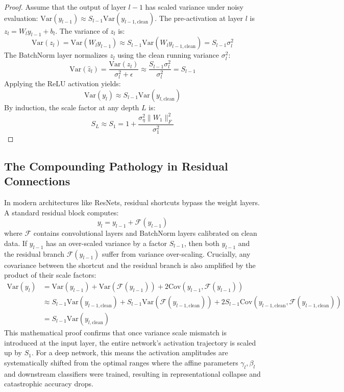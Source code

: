 \documentclass{article}
\theoremstyle{plain}
\theoremstyle{definition}
\theoremstyle{remark}
\begin{document}
\begin{proof}
Assume that the output of layer $l-1$ has scaled variance under noisy evaluation: $\text{Var}(y_{l-1}) \approx S_{l-1} \text{Var}(y_{l-1,\text{clean}})$.
The pre-activation at layer $l$ is $z_l = W_l y_{l-1} + b_l$. The variance of $z_l$ is:
\begin{equation}
    \text{Var}(z_l) = \text{Var}(W_l y_{l-1}) \approx S_{l-1} \text{Var}(W_l y_{l-1,\text{clean}}) = S_{l-1} \sigma^2_l
\end{equation}
The BatchNorm layer normalizes $z_l$ using the clean running variance $\sigma^2_l$:
\begin{equation}
    \text{Var}(\hat{z}_l) = \frac{\text{Var}(z_l)}{\sigma^2_l + \epsilon} \approx \frac{S_{l-1} \sigma^2_l}{\sigma^2_l} = S_{l-1}
\end{equation}
Applying the ReLU activation yields:
\begin{equation}
    \text{Var}(y_l) \approx S_{l-1} \text{Var}(y_{l,\text{clean}})
\end{equation}
By induction, the scale factor at any depth $L$ is:
\begin{equation}
    S_L \approx S_1 = 1 + \frac{\sigma^2_\eta \|W_1\|_F^2}{\sigma^2_1}
\end{equation}
\end{proof}

\subsection{The Compounding Pathology in Residual Connections}
In modern architectures like ResNets, residual shortcuts bypass the weight layers. A standard residual block computes:
\begin{equation}
    y_l = y_{l-1} + \mathcal{F}(y_{l-1})
\end{equation}
where $\mathcal{F}$ contains convolutional layers and BatchNorm layers calibrated on clean data.
If $y_{l-1}$ has an over-scaled variance by a factor $S_{l-1}$, then both $y_{l-1}$ and the residual branch $\mathcal{F}(y_{l-1})$ suffer from variance over-scaling. Crucially, any covariance between the shortcut and the residual branch is also amplified by the product of their scale factors:
\begin{align}
    \text{Var}(y_l) &= \text{Var}(y_{l-1}) + \text{Var}(\mathcal{F}(y_{l-1})) + 2 \text{Cov}(y_{l-1}, \mathcal{F}(y_{l-1})) \nonumber \\
    &\approx S_{l-1} \text{Var}(y_{l-1,\text{clean}}) + S_{l-1} \text{Var}(\mathcal{F}(y_{l-1,\text{clean}})) + 2 S_{l-1} \text{Cov}(y_{l-1,\text{clean}}, \mathcal{F}(y_{l-1,\text{clean}})) \nonumber \\
    &= S_{l-1} \text{Var}(y_{l,\text{clean}})
\end{align}
This mathematical proof confirms that once variance scale mismatch is introduced at the input layer, the entire network's activation trajectory is scaled up by $S_1$. For a deep network, this means the activation amplitudes are systematically shifted from the optimal ranges where the affine parameters $\gamma_l, \beta_l$ and downstream classifiers were trained, resulting in representational collapse and catastrophic accuracy drops.
\end{document}
